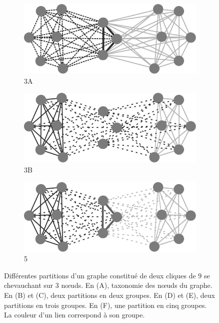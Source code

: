 \begin{figure}[h]
	\begin{subfigure}{0.3\linewidth}
			\includegraphics[width=\linewidth]{img/ExpectedNodes/2Cliques/PartitionExamples/Clique3A}
			\caption{3A\label{fig:2C3A}}		
	\end{subfigure}
	\begin{subfigure}{0.3\linewidth}
		\includegraphics[width=\linewidth]{img/ExpectedNodes/2Cliques/PartitionExamples/Clique3B}
		\caption{3B\label{fig:2C3B}}	
	\end{subfigure}
	\begin{subfigure}{0.3\linewidth}
			\includegraphics[width=\linewidth]{img/ExpectedNodes/2Cliques/PartitionExamples/Clique5}
			\caption{5\label{fig:2C5}}		
	\end{subfigure}
	\caption{Différentes partitions d'un graphe constitué de deux cliques de $9$ se chevauchant sur $3$ n\oe{}uds.
	En (A), taxonomie des n\oe{}uds du graphe.
	En (B) et (C), deux partitions en deux groupes.
	En (D) et (E), deux partitions en trois groupes.
	En (F), une partition en cinq groupes.
	La couleur d'un lien correspond à son groupe.}
	\label{fig:2C}
\end{figure}

